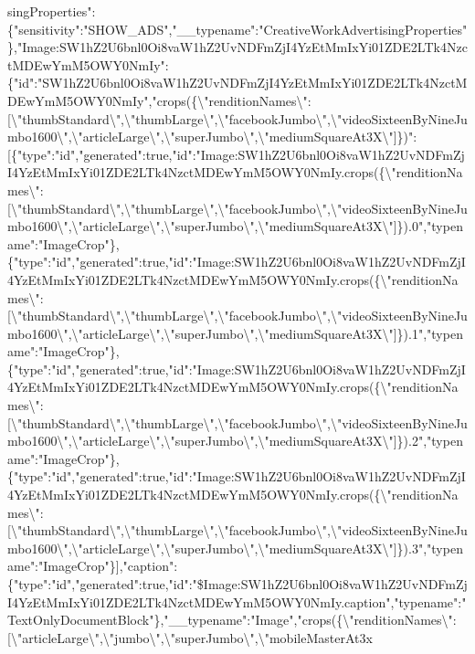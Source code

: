 singProperties":\{"sensitivity":"SHOW\_ADS","\_\_typename":"CreativeWorkAdvertisingProperties"\},"Image:SW1hZ2U6bnl0Oi8vaW1hZ2UvNDFmZjI4YzEtMmIxYi01ZDE2LTk4NzctMDEwYmM5OWY0NmIy":\{"id":"SW1hZ2U6bnl0Oi8vaW1hZ2UvNDFmZjI4YzEtMmIxYi01ZDE2LTk4NzctMDEwYmM5OWY0NmIy","crops(\{\textbackslash{}"renditionNames\textbackslash{}":{[}\textbackslash{}"thumbStandard\textbackslash{}",\textbackslash{}"thumbLarge\textbackslash{}",\textbackslash{}"facebookJumbo\textbackslash{}",\textbackslash{}"videoSixteenByNineJumbo1600\textbackslash{}",\textbackslash{}"articleLarge\textbackslash{}",\textbackslash{}"superJumbo\textbackslash{}",\textbackslash{}"mediumSquareAt3X\textbackslash{}"{]}\})":{[}\{"type":"id","generated":true,"id":"Image:SW1hZ2U6bnl0Oi8vaW1hZ2UvNDFmZjI4YzEtMmIxYi01ZDE2LTk4NzctMDEwYmM5OWY0NmIy.crops(\{\textbackslash{}"renditionNames\textbackslash{}":{[}\textbackslash{}"thumbStandard\textbackslash{}",\textbackslash{}"thumbLarge\textbackslash{}",\textbackslash{}"facebookJumbo\textbackslash{}",\textbackslash{}"videoSixteenByNineJumbo1600\textbackslash{}",\textbackslash{}"articleLarge\textbackslash{}",\textbackslash{}"superJumbo\textbackslash{}",\textbackslash{}"mediumSquareAt3X\textbackslash{}"{]}\}).0","typename":"ImageCrop"\},\{"type":"id","generated":true,"id":"Image:SW1hZ2U6bnl0Oi8vaW1hZ2UvNDFmZjI4YzEtMmIxYi01ZDE2LTk4NzctMDEwYmM5OWY0NmIy.crops(\{\textbackslash{}"renditionNames\textbackslash{}":{[}\textbackslash{}"thumbStandard\textbackslash{}",\textbackslash{}"thumbLarge\textbackslash{}",\textbackslash{}"facebookJumbo\textbackslash{}",\textbackslash{}"videoSixteenByNineJumbo1600\textbackslash{}",\textbackslash{}"articleLarge\textbackslash{}",\textbackslash{}"superJumbo\textbackslash{}",\textbackslash{}"mediumSquareAt3X\textbackslash{}"{]}\}).1","typename":"ImageCrop"\},\{"type":"id","generated":true,"id":"Image:SW1hZ2U6bnl0Oi8vaW1hZ2UvNDFmZjI4YzEtMmIxYi01ZDE2LTk4NzctMDEwYmM5OWY0NmIy.crops(\{\textbackslash{}"renditionNames\textbackslash{}":{[}\textbackslash{}"thumbStandard\textbackslash{}",\textbackslash{}"thumbLarge\textbackslash{}",\textbackslash{}"facebookJumbo\textbackslash{}",\textbackslash{}"videoSixteenByNineJumbo1600\textbackslash{}",\textbackslash{}"articleLarge\textbackslash{}",\textbackslash{}"superJumbo\textbackslash{}",\textbackslash{}"mediumSquareAt3X\textbackslash{}"{]}\}).2","typename":"ImageCrop"\},\{"type":"id","generated":true,"id":"Image:SW1hZ2U6bnl0Oi8vaW1hZ2UvNDFmZjI4YzEtMmIxYi01ZDE2LTk4NzctMDEwYmM5OWY0NmIy.crops(\{\textbackslash{}"renditionNames\textbackslash{}":{[}\textbackslash{}"thumbStandard\textbackslash{}",\textbackslash{}"thumbLarge\textbackslash{}",\textbackslash{}"facebookJumbo\textbackslash{}",\textbackslash{}"videoSixteenByNineJumbo1600\textbackslash{}",\textbackslash{}"articleLarge\textbackslash{}",\textbackslash{}"superJumbo\textbackslash{}",\textbackslash{}"mediumSquareAt3X\textbackslash{}"{]}\}).3","typename":"ImageCrop"\}{]},"caption":\{"type":"id","generated":true,"id":"\$Image:SW1hZ2U6bnl0Oi8vaW1hZ2UvNDFmZjI4YzEtMmIxYi01ZDE2LTk4NzctMDEwYmM5OWY0NmIy.caption","typename":"TextOnlyDocumentBlock"\},"\_\_typename":"Image","crops(\{\textbackslash{}"renditionNames\textbackslash{}":{[}\textbackslash{}"articleLarge\textbackslash{}",\textbackslash{}"jumbo\textbackslash{}",\textbackslash{}"superJumbo\textbackslash{}",\textbackslash{}"mobileMasterAt3x\textback